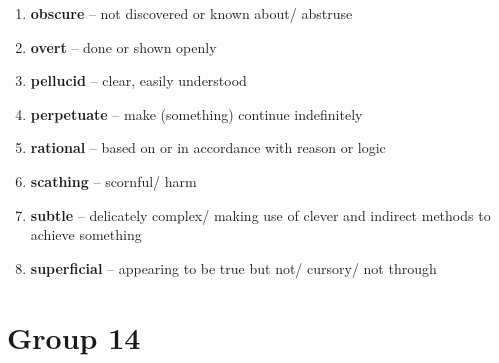 \begin{enumerate}[wide,labelindent=0pt]
\item \textbf{obscure} -- not discovered or known about/ abstruse
\item \textbf{overt} -- done or shown openly
\item \textbf{pellucid} -- clear, easily understood
\item \textbf{perpetuate} -- make (something) continue indefinitely
\item \textbf{rational} -- based on or in accordance with reason or logic
\item \textbf{scathing} -- scornful/ harm
\item \textbf{subtle} -- delicately complex/ making use of clever and indirect methods to achieve something
\item \textbf{superficial} -- appearing to be true but not/ cursory/ not through
\end{enumerate}

\newpage
\section{Group 14}


